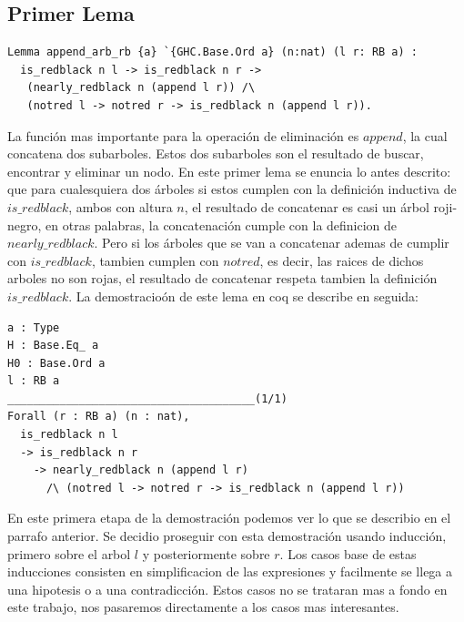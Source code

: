 \documentclass[8pt,leqno,pdflatex,spanish]{book}
\newcommand{\arn}{árbol roji-negro}
\theoremstyle{plain}
\theoremstyle{definition}
\theoremstyle{remark}
\begin{document}
\subsection{Primer Lema}
\begin{verbatim}
Lemma append_arb_rb {a} `{GHC.Base.Ord a} (n:nat) (l r: RB a) : 
  is_redblack n l -> is_redblack n r ->
   (nearly_redblack n (append l r)) /\
   (notred l -> notred r -> is_redblack n (append l r)).
\end{verbatim}

La funci\'on mas importante para la operaci\'on de eliminaci\'on es $append$, la cual concatena 
dos subarboles. Estos dos subarboles son el resultado de buscar, encontrar y eliminar un nodo. En 
este primer lema se enuncia lo antes descrito: que para cualesquiera dos \'arboles si estos 
cumplen con la definici\'on inductiva de $is\_redblack$, ambos con altura $n$, el resultado de 
concatenar es casi un {\arn}, en otras palabras, la concatenaci\'on cumple con la definicion de 
$nearly\_redblack$. Pero si los \'arboles que se van a concatenar ademas de cumplir con 
$is\_redblack$, tambien cumplen con $notred$, es decir, las raices de dichos arboles no son rojas, 
el resultado de concatenar respeta tambien la definici\'on $is\_redblack$. La demostracio\'on de 
este lema en coq se describe en seguida:
\begin{verbatim}
a : Type
H : Base.Eq_ a
H0 : Base.Ord a
l : RB a
______________________________________(1/1)
Forall (r : RB a) (n : nat),
  is_redblack n l
  -> is_redblack n r
    -> nearly_redblack n (append l r)
      /\ (notred l -> notred r -> is_redblack n (append l r))
\end{verbatim}

En este primera etapa de la demostraci\'on podemos ver lo que se describio en el parrafo anterior. 
Se decidio proseguir con esta demostraci\'on usando inducci\'on, primero sobre el arbol $l$ y 
posteriormente sobre $r$. Los casos base de estas inducciones consisten en simplificacion de las 
expresiones y facilmente se llega a una hipotesis o a una contradicci\'on. Estos casos no se 
trataran mas a fondo en este trabajo, nos pasaremos directamente a los casos mas interesantes.
\end{document}
